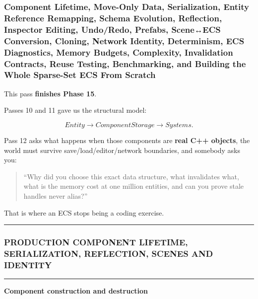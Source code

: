 \subsubsection{Component Lifetime, Move-Only Data, Serialization, Entity Reference Remapping, Schema Evolution, Reflection, Inspector Editing, Undo/Redo, Prefabs, Scene↔ECS Conversion, Cloning, Network Identity, Determinism, ECS Diagnostics, Memory Budgets, Complexity, Invalidation Contracts, Reuse Testing, Benchmarking, and Building the Whole Sparse-Set ECS From Scratch}\label{component-lifetime-move-only-data-serialization-entity-reference-remapping-schema-evolution-reflection-inspector-editing-undoredo-prefabs-sceneecs-conversion-cloning-network-identity-determinism-ecs-diagnostics-memory-budgets-complexity-invalidation-contracts-reuse-testing-benchmarking-and-building-the-whole-sparse-set-ecs-from-scratch}

This pass \textbf{finishes Phase 15}.

Passes 10 and 11 gave us the structural model:

\[
Entity
\rightarrow
ComponentStorage
\rightarrow
Systems.
\]

Pass 12 asks what happens when those components are \textbf{real C++ objects}, the world must survive save/load/editor/network boundaries, and somebody asks you:

\begin{quote}
``Why did you choose this exact data structure, what invalidates what, what is the memory cost at one million entities, and can you prove stale handles never alias?''
\end{quote}

That is where an ECS stops being a coding exercise.

\begin{center}\rule{0.5\linewidth}{0.5pt}\end{center}

\subsubsection{PRODUCTION COMPONENT LIFETIME, SERIALIZATION, REFLECTION, SCENES AND IDENTITY}\label{production-component-lifetime-serialization-reflection-scenes-and-identity}

\begin{center}\rule{0.5\linewidth}{0.5pt}\end{center}

\textbf{Component construction and destruction}

